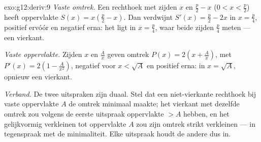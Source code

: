 \begin{solution}{exo:g12:deriv:9}
\emph{Vaste omtrek.} Een rechthoek met zijden $x$ en $\frac{p}{2} - x$
($0 < x < \frac p2$) heeft oppervlakte $S(x) = x\left(\frac p2 - x\right)$.
Dan verdwijnt $S'(x) = \frac p2 - 2x$ in $x = \frac p4$, positief ervóór en
negatief erna: het  ligt in $x = \frac{p}{4}$, waar beide zijden
$\frac p4$ meten --- een vierkant.

\emph{Vaste oppervlakte.} Zijden $x$ en $\frac Ax$ geven omtrek
$P(x) = 2\left(x + \frac Ax\right)$, met
$P'(x) = 2\left(1 - \frac{A}{x^2}\right)$, negatief voor $x < \sqrt A$ en
positief erna:  in $x = \sqrt{A}$, opnieuw een vierkant.

\emph{Verband.} De twee uitspraken zijn duaal. Stel dat een niet-vierkante
rechthoek bij vaste oppervlakte $A$ de omtrek minimaal maakte; het vierkant
met dezelfde omtrek zou volgens de eerste uitspraak oppervlakte $> A$ hebben,
en het gelijkvormig verkleinen tot oppervlakte $A$ zou zijn omtrek strikt
verkleinen --- in tegenspraak met de minimaliteit. Elke uitspraak houdt de
andere dus in.
\end{solution}

